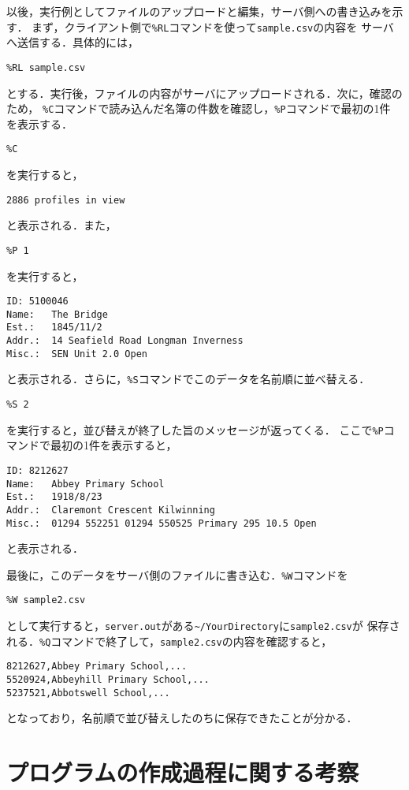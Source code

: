 \documentclass[a4j,10pt]{jarticle}
\begin{document}
以後，実行例としてファイルのアップロードと編集，サーバ側への書き込みを示す．
まず，クライアント側で\verb|%RL|コマンドを使って\verb|sample.csv|の内容を
サーバへ送信する．具体的には，
\begin{verbatim}
%RL sample.csv
\end{verbatim}
とする．実行後，ファイルの内容がサーバにアップロードされる．次に，確認のため，
\verb|%C|コマンドで読み込んだ名簿の件数を確認し，\verb|%P|コマンドで最初の1件
を表示する．
\begin{verbatim}
%C
\end{verbatim}
を実行すると，
\begin{verbatim}
2886 profiles in view
\end{verbatim}
と表示される．また，
\begin{verbatim}
%P 1
\end{verbatim}
を実行すると，
\begin{verbatim}
ID:	5100046
Name:	The Bridge
Est.:	1845/11/2
Addr.:	14 Seafield Road Longman Inverness
Misc.:	SEN Unit 2.0 Open

\end{verbatim}
と表示される．さらに，\verb|%S|コマンドでこのデータを名前順に並べ替える．
\begin{verbatim}
%S 2
\end{verbatim}
を実行すると，並び替えが終了した旨のメッセージが返ってくる．
ここで\verb|%P|コマンドで最初の1件を表示すると，
\begin{verbatim}
ID:	8212627
Name:	Abbey Primary School
Est.:	1918/8/23
Addr.:	Claremont Crescent Kilwinning
Misc.:	01294 552251 01294 550525 Primary 295 10.5 Open

\end{verbatim}
と表示される．

最後に，このデータをサーバ側のファイルに書き込む．\verb|%W|コマンドを
\begin{verbatim}
%W sample2.csv
\end{verbatim}
として実行すると，\verb|server.out|がある\verb|~/YourDirectory|に\verb|sample2.csv|が
保存される．\verb|%Q|コマンドで終了して，\verb|sample2.csv|の内容を確認すると，
\begin{verbatim}
8212627,Abbey Primary School,...
5520924,Abbeyhill Primary School,...
5237521,Abbotswell School,...
\end{verbatim}
となっており，名前順で並び替えしたのちに保存できたことが分かる．

\section{プログラムの作成過程に関する考察}
\end{document}
